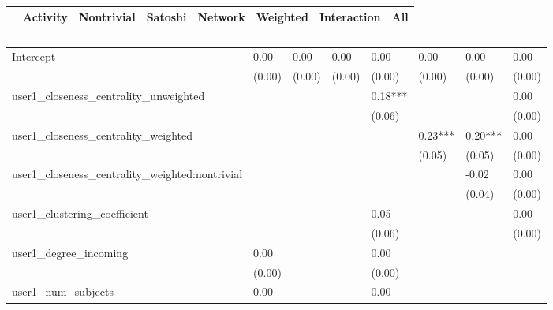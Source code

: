 \begin{table}
\caption{}
\begin{center}
\begin{tabular}{lccccccc}
\hline
                                               & Activity & Nontrivial & Satoshi & Network & Weighted & Interaction &  All    \\
\hline
\hline
\end{tabular}
\begin{tabular}{llllllll}
Intercept                                      & 0.00     & 0.00       & 0.00    & 0.00    & 0.00     & 0.00        & 0.00    \\
                                               & (0.00)   & (0.00)     & (0.00)  & (0.00)  & (0.00)   & (0.00)      & (0.00)  \\
user1_closeness_centrality_unweighted          &          &            &         & 0.18*** &          &             & 0.00    \\
                                               &          &            &         & (0.06)  &          &             & (0.00)  \\
user1_closeness_centrality_weighted            &          &            &         &         & 0.23***  & 0.20***     & 0.00    \\
                                               &          &            &         &         & (0.05)   & (0.05)      & (0.00)  \\
user1_closeness_centrality_weighted:nontrivial &          &            &         &         &          & -0.02       & 0.00    \\
                                               &          &            &         &         &          & (0.04)      & (0.00)  \\
user1_clustering_coefficient                   &          &            &         & 0.05    &          &             & 0.00    \\
                                               &          &            &         & (0.06)  &          &             & (0.00)  \\
user1_degree_incoming                          & 0.00     &            &         & 0.00    &          &             &         \\
                                               & (0.00)   &            &         & (0.00)  &          &             &         \\
user1_num_subjects                             & 0.00     &            &         & 0.00    &          &             &         \\

\end{tabular}
\end{center}
\end{table}

